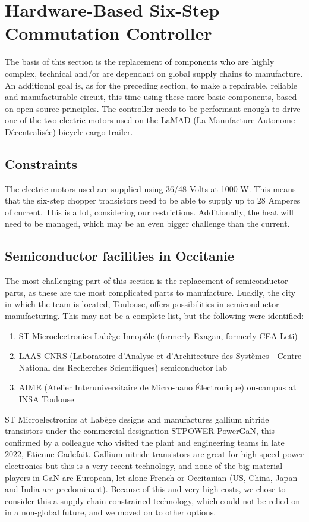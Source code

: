 \section{Hardware-Based Six-Step Commutation Controller}
\label{sec:sixstep}

The basis of this section is the replacement of components who are highly complex, technical and/or are dependant on global supply chains to manufacture. An additional goal is, as for the preceding section, to make a repairable, reliable and manufacturable circuit, this time using these more basic components, based on open-source principles. The controller needs to be performant enough to drive one of the two electric motors used on the LaMAD (La Manufacture Autonome Décentralisée) bicycle cargo trailer.\cite{noauthor_ddf-39_nodate}

\subsection{Constraints}
The electric motors used are supplied using 36/48 Volts at 1000 W. This means that the six-step chopper transistors need to be able to supply up to 28 Amperes of current. This is a lot, considering our restrictions. Additionally, the heat will need to be managed, which may be an even bigger challenge than the current.

\subsection{Semiconductor facilities in Occitanie}
The most challenging part of this section is the replacement of semiconductor parts, as these are the most complicated parts to manufacture. Luckily, the city in which the team is located, Toulouse, offers possibilities in semiconductor manufacturing. This may not be a complete list, but the following were identified:

\begin{enumerate}
	\item ST Microelectronics Labège-Innopôle (formerly Exagan, formerly CEA-Leti) 
	\item LAAS-CNRS (Laboratoire d'Analyse et d'Architecture des Systèmes - Centre National des Recherches Scientifiques) semiconductor lab
	\item AIME (Atelier Interuniversitaire de Micro-nano Électronique) on-campus at INSA Toulouse
\end{enumerate}

ST Microelectronics at Labège designs and manufactures gallium nitride transistors under the commercial designation STPOWER PowerGaN, this confirmed by a colleague who visited the plant and engineering teams in late 2022, Etienne Gadefait. Gallium nitride transistors are great for high speed power electronics %
but this is a very recent technology, and none of the big material players in GaN are European, let alone French or Occitanian (US, China, Japan and India are predominant). %
 Because of this and very high costs, we chose to consider this a supply chain-constrained technology, which could not be relied on in a non-global future, and we moved on to other options.
 
